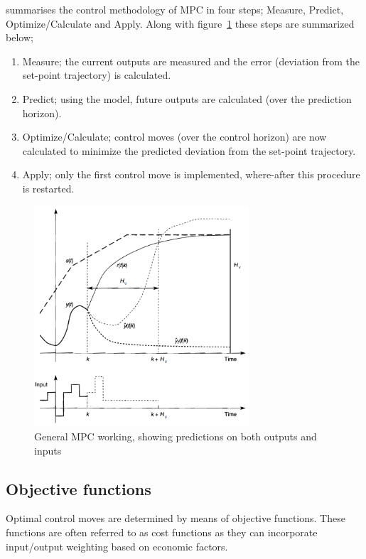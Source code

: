 \citet[8]{maciejowskimpc} summarises the control methodology of MPC in four steps; Measure, Predict, Optimize/Calculate and Apply. 
Along with figure~\ref{fig:mpc:general} these steps are summarized below;
\begin{enumerate}
  \item Measure; the current outputs are measured and the error (deviation from the set-point trajectory) is calculated.
  \item Predict; using the model, future outputs are calculated (over the prediction horizon).
  \item Optimize/Calculate; control moves (over the control horizon) are now calculated to minimize the predicted deviation from the set-point trajectory.
  \item Apply; only the first control move is implemented, where-after this procedure is restarted.
\end{enumerate}
\begin{figure}[htbp]
  \centering
  \includegraphics[width=8cm]{graph/mpc_general}
  \caption[General MPC working]{General MPC working, showing predictions on both outputs and inputs}
  \label{fig:mpc:general}
\end{figure}

\subsection{Objective functions}
Optimal control moves are determined by means of objective functions.
These functions are often referred to as cost functions \citep[41]{maciejowskimpc} as they can incorporate input/output weighting based on economic factors.

